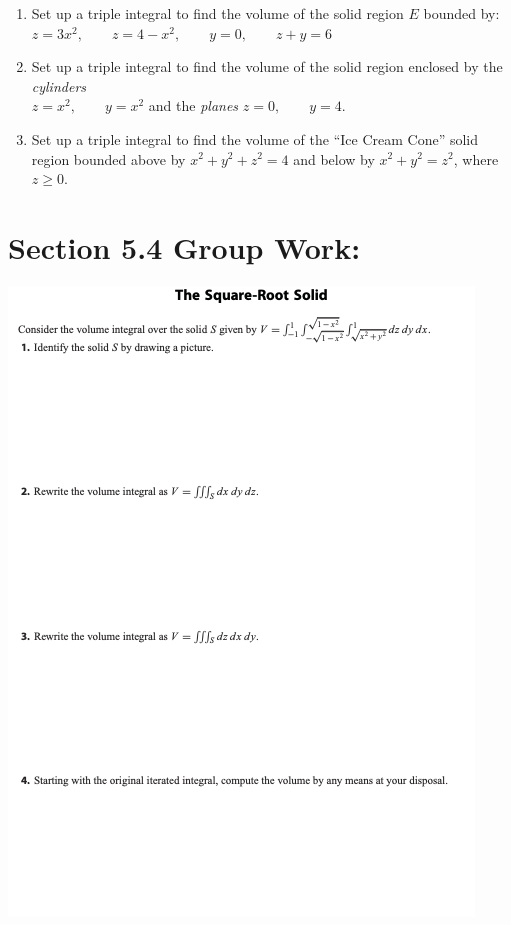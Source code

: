 %
%






\begin{enumerate}[{Example} 1: ]

\item Set up a triple integral to find the volume of the solid region \( {E}\) bounded by:\\
\(z=3x^2, \qquad z=4-x^2, \qquad y=0, \qquad z+y = 6\)
\vfill

\item Set up a triple integral to find the volume of the solid region enclosed by the \textit{cylinders}\\
\(z=x^2, \qquad y=x^2\) and the \textit{planes} \(z=0, \qquad y=4\).%

\item Set up a triple integral to find the volume of the ``Ice Cream Cone'' solid region bounded above by \(x^2+y^2+z^2=4\) and below by \(x^2+y^2 = z^2\), where \(z\geq 0\).


\end{enumerate}

\pagebreak

\section*{Section 5.4 Group Work:}

\includegraphics[height=.9\textheight]{The-Square-Root-Solid.png}





